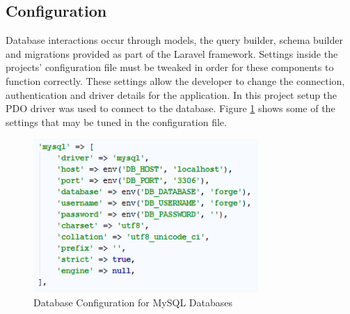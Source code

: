 \subsection{Configuration}
Database interactions occur through models, the query builder, schema builder and migrations provided as part of the Laravel framework. Settings inside the projects' configuration file must be tweaked in order for these components to function correctly. These settings allow the developer to change the connection, authentication and driver details for the application. In this project setup the PDO driver was used to connect to the database. Figure \ref{fig:DatabaseConfig} shows some of the settings that may be tuned in the configuration file.

\begin{figure}[H]
	\centering
	\includegraphics[height=2.3in]{Images/Implementation/MySQLConfig}
	\caption{Database Configuration for MySQL Databases} \label{fig:DatabaseConfig}
\end{figure}

